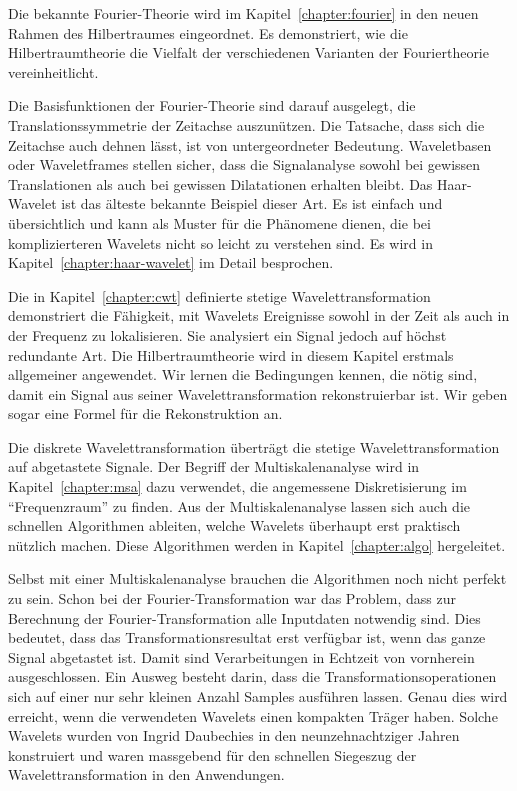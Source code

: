 Die bekannte Fourier-Theorie wird im Kapitel~\ref{chapter:fourier} in
den neuen Rahmen des Hilbertraumes eingeordnet.
Es demonstriert, wie die Hilbertraumtheorie die Vielfalt der 
verschiedenen Varianten der Fouriertheorie vereinheitlicht.

Die Basisfunktionen der Fourier-Theorie sind darauf ausgelegt,
die Translationssymmetrie der Zeitachse auszunützen.
Die Tatsache, dass sich die Zeitachse auch dehnen lässt, ist von
untergeordneter Bedeutung.
Waveletbasen oder Waveletframes stellen sicher, dass die Signalanalyse
sowohl bei gewissen Translationen als auch bei gewissen Dilatationen
erhalten bleibt.
%
%
Das Haar-Wavelet ist das älteste bekannte Beispiel dieser Art.
Es ist einfach und übersichtlich und kann als Muster für die
Phänomene dienen, die bei komplizierteren Wavelets nicht so leicht
zu verstehen sind.
Es wird in Kapitel~\ref{chapter:haar-wavelet} im Detail besprochen.

Die in Kapitel~\ref{chapter:cwt} definierte stetige Wavelettransformation
%
demonstriert die Fähigkeit, mit Wavelets Ereignisse sowohl in der Zeit
als auch in der Frequenz zu lokalisieren.
Sie analysiert ein Signal jedoch auf höchst redundante Art.
Die Hilbert\-raum\-theorie wird in diesem Kapitel erstmals allgemeiner
angewendet.
Wir lernen die Be\-ding\-ungen kennen, die nötig sind, damit ein Signal
aus seiner Wavelettransformation rekonstruierbar ist.
Wir geben sogar eine Formel für die Rekonstruktion an.

Die diskrete Wavelettransformation überträgt die stetige
Wavelettransformation auf abgetastete Signale.
Der Begriff der Multiskalenanalyse wird in Kapitel~\ref{chapter:msa}
dazu verwendet, die angemessene Diskretisierung im ``Frequenzraum''
zu finden.
Aus der Multiskalenanalyse lassen sich auch die schnellen Algorithmen
%
ableiten, welche Wavelets überhaupt erst praktisch nützlich machen.
Diese Algorithmen werden in Kapitel~\ref{chapter:algo} hergeleitet.

Selbst mit einer Multiskalenanalyse brauchen die Algorithmen noch nicht
perfekt zu sein.
Schon bei der Fourier-Transformation war das Problem, dass zur Berechnung
der Fourier-Trans\-for\-ma\-tion alle Inputdaten notwendig sind.
Dies bedeutet, dass das Transformationsresultat erst verfügbar ist,
wenn das ganze Signal abgetastet ist.
Damit sind Verarbeitungen in Echtzeit von vornherein ausgeschlossen.
Ein Ausweg besteht darin, dass die Transformationsoperationen sich auf
einer nur sehr kleinen Anzahl Samples ausführen lassen.
Genau dies wird erreicht, wenn die verwendeten Wavelets einen kompakten Träger
haben.
Solche Wavelets wurden von Ingrid Daubechies in den neun\-zehn\-achtziger
%
%
Jahren konstruiert und waren massgebend für den schnellen Siegeszug 
der Wavelettransformation in den Anwendungen.

